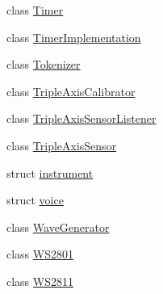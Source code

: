 \begin{DoxyCompactItemize}
class \hyperlink{classflame_1_1_timer}{Timer}
\item 
class \hyperlink{classflame_1_1_timer_implementation}{Timer\-Implementation}
\item 
class \hyperlink{classflame_1_1_tokenizer}{Tokenizer}
\item 
class \hyperlink{classflame_1_1_triple_axis_calibrator}{Triple\-Axis\-Calibrator}
\item 
class \hyperlink{classflame_1_1_triple_axis_sensor_listener}{Triple\-Axis\-Sensor\-Listener}
\item 
class \hyperlink{classflame_1_1_triple_axis_sensor}{Triple\-Axis\-Sensor}
\item 
struct \hyperlink{structflame_1_1instrument}{instrument}
\item 
struct \hyperlink{structflame_1_1voice}{voice}
\item 
class \hyperlink{classflame_1_1_wave_generator}{Wave\-Generator}
\item 
class \hyperlink{classflame_1_1_w_s2801}{W\-S2801}
\item 
class \hyperlink{classflame_1_1_w_s2811}{W\-S2811}
\end{DoxyCompactItemize}

